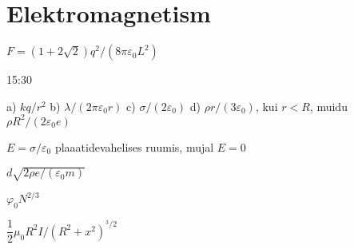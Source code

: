 \documentclass[a4paper,11pt,twocolumn]{article}
\begin{document}
\section{Elektromagnetism}
\begin{solutions}
	\item \( F = (1 + 2\sqrt2)q^2/(8\pi\varepsilon_0 L^2) \)
	\item 15:30
	\item a) \( kq/r^2 \) b) \( \lambda/(2\pi\varepsilon_0 r) \) c) \( \sigma/(2\varepsilon_0) \) d) \( \rho r/(3\varepsilon_0) \), kui \( r<R \), muidu \( \rho R^2/(2\varepsilon_0 e) \)
	\item \( E=\sigma/\varepsilon_0 \) plaaatidevahelises ruumis, mujal \( E=0 \)
	\item \( d\sqrt{2\rho e/(\varepsilon_0 m)} \)
	\item \( \varphi_0 N^{2/3} \) 
	\item 
	\item 
	\item
	\item \( \dfrac{1}{2}\mu_0 R^2 I/(R^2+x^2)^{^3/2} \)
\end{solutions}
\end{document}
